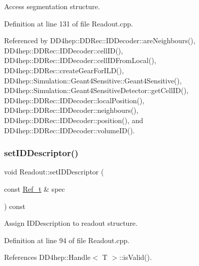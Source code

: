 Access segmentation structure. 



Definition at line 131 of file Readout.\+cpp.



Referenced by D\+D4hep\+::\+D\+D\+Rec\+::\+I\+D\+Decoder\+::are\+Neighbours(), D\+D4hep\+::\+D\+D\+Rec\+::\+I\+D\+Decoder\+::cell\+I\+D(), D\+D4hep\+::\+D\+D\+Rec\+::\+I\+D\+Decoder\+::cell\+I\+D\+From\+Local(), D\+D4hep\+::\+D\+D\+Rec\+::create\+Gear\+For\+I\+L\+D(), D\+D4hep\+::\+Simulation\+::\+Geant4\+Sensitive\+::\+Geant4\+Sensitive(), D\+D4hep\+::\+Simulation\+::\+Geant4\+Sensitive\+Detector\+::get\+Cell\+I\+D(), D\+D4hep\+::\+D\+D\+Rec\+::\+I\+D\+Decoder\+::local\+Position(), D\+D4hep\+::\+D\+D\+Rec\+::\+I\+D\+Decoder\+::neighbours(), D\+D4hep\+::\+D\+D\+Rec\+::\+I\+D\+Decoder\+::position(), and D\+D4hep\+::\+D\+D\+Rec\+::\+I\+D\+Decoder\+::volume\+I\+D().

\hypertarget{class_d_d4hep_1_1_geometry_1_1_readout_a81ed73ae7aca9dd1c7527c89026bc1a0}{}\label{class_d_d4hep_1_1_geometry_1_1_readout_a81ed73ae7aca9dd1c7527c89026bc1a0} 
\subsubsection{\texorpdfstring{set\+I\+D\+Descriptor()}{setIDDescriptor()}}
{\footnotesize\ttfamily void Readout\+::set\+I\+D\+Descriptor (\begin{DoxyParamCaption}\item[{const \hyperlink{group___d_d4_h_e_p___g_e_o_m_e_t_r_y_ga40af83be6718bb8828a3d83dc7f8c930}{Ref\+\_\+t} \&}]{spec }\end{DoxyParamCaption}) const}



Assign I\+D\+Description to readout structure. 



Definition at line 94 of file Readout.\+cpp.



References D\+D4hep\+::\+Handle$<$ T $>$\+::is\+Valid().

\hypertarget{class_d_d4hep_1_1_geometry_1_1_readout_a5a60acbfd37bf1a420ee2b9254a373da}{}\label{class_d_d4hep_1_1_geometry_1_1_readout_a5a60acbfd37bf1a420ee2b9254a373da} 

